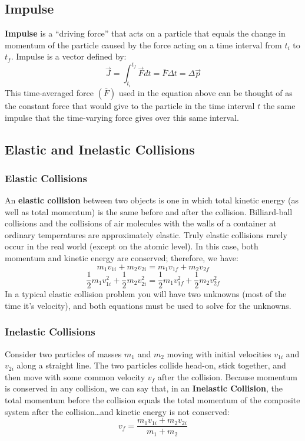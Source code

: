 \documentclass{article}
\begin{document}
	\subsection{Impulse}
		\textbf{Impulse} is a ``driving force'' that acts on a particle that equals the change in momentum of the particle caused by the force acting on a time interval from $t_i$ to $t_f$. Impulse is a vector defined by:
		\[
			\vec{J}=\int_{t_i}^{t_f} \vec{F} dt=\bar{F}\Delta t=\Delta\vec{p}
		\]
		This time-averaged force $(\bar{F})$ used in the equation above can be thought of as the constant force that would give to the particle in the time interval $t$ the same impulse that the time-varying force gives over this same interval.
	
    \subsection{Elastic and Inelastic Collisions}
    	\subsubsection{Elastic Collisions}
        	An \textbf{elastic collision} between two objects is one in which total kinetic energy (as well as total momentum) is the same before and after the collision. Billiard-ball collisions and the collisions of air molecules with the walls of a container at ordinary temperatures are approximately elastic. Truly elastic collisions rarely occur in the real world (except on the atomic level). In this case, both momentum and kinetic energy are conserved; therefore, we have:
            \[
            	m_1v_{1i}+m_2v_{2i}=m_1v_{1f}+m_2v_{2f}
            \]
            \[
            	\frac{1}{2}m_1v_{1i}^2+\frac{1}{2}m_2v_{2i}^2=\frac{1}{2}m_1v_{1f}^2+\frac{1}{2}m_2v_{2f}^2
            \]
            In a typical elastic collision problem you will have two unknowns (most of the time it's velocity), and both equations must be used to solve for the unknowns.
		\subsubsection{Inelastic Collisions}
        	Consider two particles of masses $m_1$ and $m_2$ moving with initial velocities $v_{1i}$ and $v_{2i}$ along a straight line. The two particles collide head-on, stick together, and then move with some common velocity $v_f$ after the collision. Because momentum is conserved in any collision, we can say that, in an \textbf{Inelastic Collision}, the total momentum before the collision equals the total momentum of the composite system after the collision\ldots and kinetic energy is not conserved:
            \[
            	v_f=\frac{m_1v_{1i}+m_2v_{2i}}{m_1+m_2}
            \]
\end{document}

